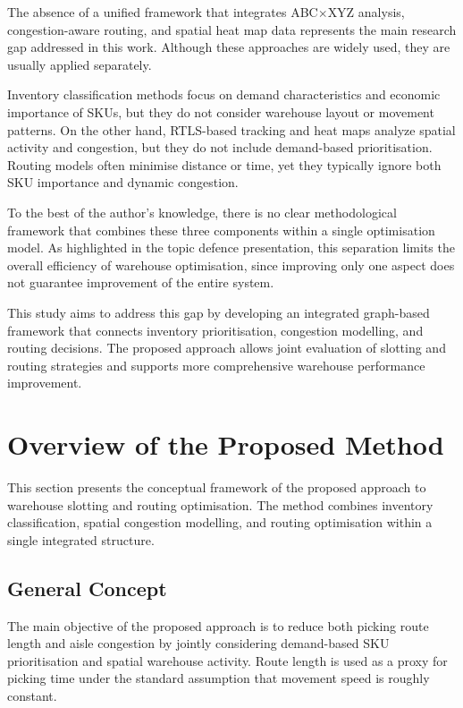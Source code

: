 \documentclass[12pt,a4paper]{article}
\begin{document}
The absence of a unified framework that integrates ABC$\times$XYZ analysis,
congestion-aware routing, and spatial heat map data represents the main research gap
addressed in this work. Although these approaches are widely used, they are usually applied
separately.

Inventory classification methods focus on demand characteristics and economic importance
of SKUs, but they do not consider warehouse layout or movement patterns. On the other
hand, RTLS-based tracking and heat maps analyze spatial activity and congestion, but they
do not include demand-based prioritisation. Routing models often minimise distance or time,
yet they typically ignore both SKU importance and dynamic congestion.

To the best of the author's knowledge, there is no clear methodological framework that
combines these three components within a single optimisation model. As highlighted in the
topic defence presentation, this separation limits the overall efficiency of warehouse
optimisation, since improving only one aspect does not guarantee improvement of the entire
system.

This study aims to address this gap by developing an integrated graph-based framework
that connects inventory prioritisation, congestion modelling, and routing decisions. The
proposed approach allows joint evaluation of slotting and routing strategies and supports
more comprehensive warehouse performance improvement.

\section{Overview of the Proposed Method}

This section presents the conceptual framework of the proposed approach to warehouse
slotting and routing optimisation. The method combines inventory classification, spatial
congestion modelling, and routing optimisation within a single integrated structure.

\subsection{General Concept}

The main objective of the proposed approach is to reduce both picking route length
and aisle congestion by jointly considering demand-based SKU prioritisation and
spatial warehouse activity. Route length is used as a proxy for picking time under
the standard assumption that movement speed is roughly constant.
\end{document}
